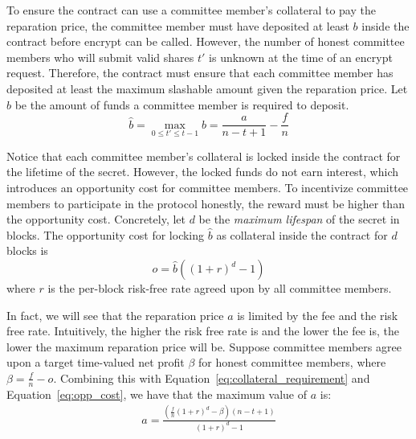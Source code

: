 To ensure the contract can use a committee member's collateral to pay the reparation price, the committee member must have deposited at least $b$ inside the contract before \textsf{encrypt} can be called.
However, the number of honest committee members who will submit valid shares $t'$ is unknown at the time of an \textsf{encrypt} request.
Therefore, the contract must ensure that each committee member has deposited at least the maximum slashable amount given the reparation price.
Let $\hat{b}$ be the amount of funds a committee member is required to deposit.
\begin{equation}\label{eq:collateral_requirement}
    \hat{b} = \max_{0 \leq t' \leq t - 1} b = \frac{a}{n - t + 1} - \frac{f}{n}
\end{equation}

Notice that each committee member's collateral is locked inside the contract for the lifetime of the secret.
However, the locked funds do not earn interest, which introduces an opportunity cost for committee members.
To incentivize committee members to participate in the protocol honestly, the reward must be higher than the opportunity cost.
Concretely, let $d$ be the \emph{maximum lifespan} of the secret in blocks.
The opportunity cost for locking $\hat{b}$ as collateral inside the contract for $d$ blocks is
\begin{equation}\label{eq:opp_cost}
    o = \hat{b}((1 + r)^d - 1)
\end{equation}
where $r$ is the per-block risk-free rate agreed upon by all committee members.

In fact, we will see that the reparation price $a$ is limited by the fee and the risk free rate.
Intuitively, the higher the risk free rate is and the lower the fee is, the lower the maximum reparation price will be.
Suppose committee members agree upon a target time-valued net profit $\beta$ for honest committee members, where $\beta = \frac{f}{n} - o$.
Combining this with Equation~\ref{eq:collateral_requirement} and Equation~\ref{eq:opp_cost}, we have that the maximum value of $a$ is:
\begin{gather}\label{eq:collateral_from_holding_fee}
    a = \frac{(\frac{f}{n}(1 + r)^d - \beta)(n - t + 1)}{(1 + r)^d - 1}
\end{gather}

